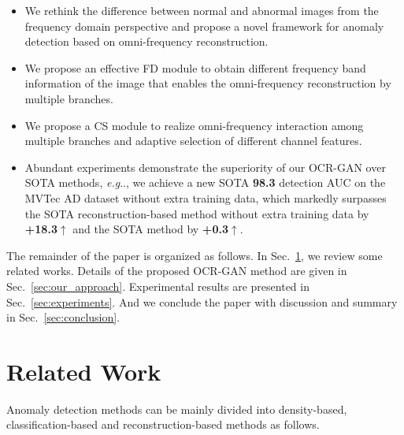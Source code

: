 \documentclass[lettersize,journal]{IEEEtran}
\makeatletter
\DeclareRobustCommand\onedot{\futurelet\@let@token\@onedot}
\def\@onedot{\ifx\@let@token.\else.\null\fi\xspace}
\def\eg{\emph{e.g}\onedot} \def\Eg{\emph{E.g}\onedot}
\makeatother
\begin{document}
\begin{itemize}
    \item We rethink the difference between normal and abnormal images from the frequency domain perspective and propose a novel framework for anomaly detection based on omni-frequency reconstruction.
    \item We propose an effective FD module to obtain different frequency band information of the image that enables the omni-frequency reconstruction by multiple branches.
    \item We propose a CS module to realize omni-frequency interaction among multiple branches and adaptive selection of different channel features.
    \item Abundant experiments demonstrate the superiority of our OCR-GAN over SOTA methods, \eg, we achieve a new SOTA \textbf{98.3} detection AUC on the MVTec AD dataset without extra training data, which markedly surpasses the SOTA reconstruction-based method without extra training data by \textbf{+18.3}$\uparrow$ and the SOTA method by \textbf{+0.3}$\uparrow$.
\end{itemize}

The remainder of the paper is organized as follows. In Sec.~\ref{sec:related_work}, we review some related works. Details of the proposed OCR-GAN method are given in Sec.~\ref{sec:our_approach}. Experimental results are presented in Sec.~\ref{sec:experiments}. And we conclude the paper with discussion and summary in Sec.~\ref{sec:conclusion}.

\section{Related Work}\label{sec:related_work}
Anomaly detection methods can be mainly divided into density-based, classification-based and reconstruction-based methods as follows.
\end{document}
